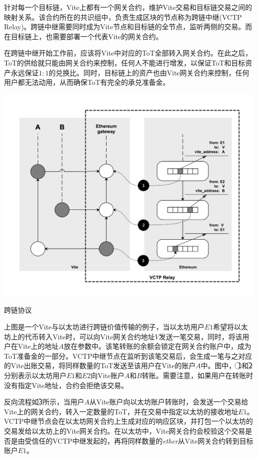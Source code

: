 \documentclass[UTF8,nofonts]{ctexart}
\makeatletter
\newenvironment{figurehere}
 {\def\@captype{figure}}
 {}
\makeatother
\begin{document}
\begin{multicols}{2}
针对每一个目标链，Vite上都有一个网关合约，维护Vite交易和目标链交易之间的映射关系。该合约所在的共识组中，负责生成区块的节点称为跨链中继(VCTP Relay)。跨链中继需要同时成为Vite节点和目标链的全节点，监听两侧的交易。而在目标链上，也需要部署一个代表Vite的网关合约。

在跨链中继开始工作前，应该将Vite中对应的ToT全部转入网关合约。在此之后，ToT的供给就只能由网关合约来控制，任何人不能进行增发，以保证ToT和目标资产永远保证$1:1$的兑换比。同时，目标链上的资产也由Vite网关合约来控制，任何用户都无法动用，从而确保ToT有完全的承兑准备金。

\begin{center}
\begin{figurehere}
\includegraphics[width=\linewidth]{image/crosschain.png}
\caption{跨链协议}
\end{figurehere}
\end{center}

上图是一个Vite与以太坊进行跨链价值传输的例子，当以太坊用户$E1$希望将以太坊上的代币转入Vite时，可以向Vite网关合约地址$V$发送一笔交易，同时，将该用户在Vite上的地址$A$放在参数中。该笔转账的余额会锁定在网关合约账户中，成为ToT准备金的一部分。VCTP中继节点在监听到该笔交易后，会生成一笔与之对应的Vite出账交易，将同样数量的ToT发送至该用户在Vite的账户$A$中。图中，
\textcircled{1}和\textcircled{2}分别表示以太坊用户$E1$和$E2$向Vite账户$A$和$B$转账。需要注意，如果用户在转账时没有指定Vite地址，合约会拒绝该交易。

反向流程如\textcircled{3}所示，当用户$A$从Vite账户向以太坊账户转账时，会发送一个交易给Vite上的网关合约，转入一定数量的ToT，并在交易中指定以太坊的接收地址$E1$。VCTP中继节点会在以太坊网关合约上生成对应的响应区块，并打包一个以太坊的交易发给以太坊上的Vite网关合约。在以太坊中，Vite网关合约会校验这个交易是否是由受信任的VCTP中继发起的，再将同样数量的\textit{ether}从Vite网关合约转到目标账户$E1$。


\end{multicols}
\end{document}
